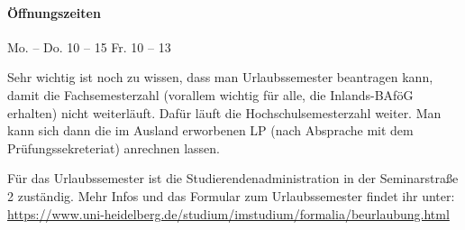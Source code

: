 \paragraph{Öffnungszeiten} Mo. -- Do. 10 -- 15 \qquad Fr. 10 -- 13

Sehr wichtig ist noch zu wissen, dass man Urlaubssemester beantragen kann, damit die Fachsemesterzahl (vorallem wichtig für alle, die Inlands-BAföG erhalten) nicht weiterläuft. Dafür läuft die Hochschulsemesterzahl weiter. Man kann sich dann die im Ausland erworbenen \gls{LP} (nach Absprache mit dem Prüfungssekreteriat) anrechnen lassen.

Für das Urlaubssemester ist die Studierendenadministration in der Seminarstraße 2 zuständig. Mehr Infos und das Formular zum Urlaubssemester findet ihr unter:
\url{https://www.uni-heidelberg.de/studium/imstudium/formalia/beurlaubung.html}

